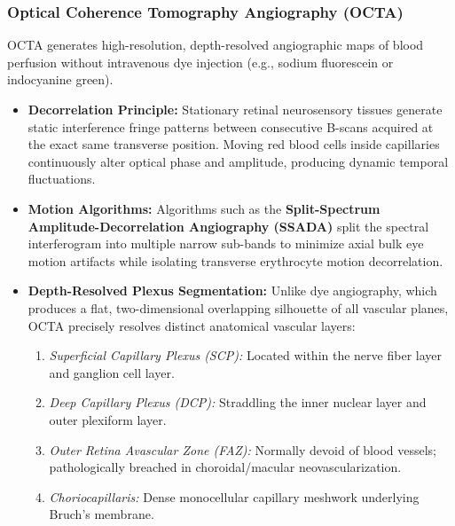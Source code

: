 \documentclass[11pt,a4paper]{article}
\begin{document}
\subsubsection{Optical Coherence Tomography Angiography (OCTA)}
OCTA generates high-resolution, depth-resolved angiographic maps of blood perfusion without intravenous dye injection (e.g., sodium fluorescein or indocyanine green).
\begin{itemize}[leftmargin=*]
    \item \textbf{Decorrelation Principle:} Stationary retinal neurosensory tissues generate static interference fringe patterns between consecutive B-scans acquired at the exact same transverse position. Moving red blood cells inside capillaries continuously alter optical phase and amplitude, producing dynamic temporal fluctuations.
    \item \textbf{Motion Algorithms:} Algorithms such as the \textbf{Split-Spectrum Amplitude-Decorrelation Angiography (SSADA)} split the spectral interferogram into multiple narrow sub-bands to minimize axial bulk eye motion artifacts while isolating transverse erythrocyte motion decorrelation.
    \item \textbf{Depth-Resolved Plexus Segmentation:} Unlike dye angiography, which produces a flat, two-dimensional overlapping silhouette of all vascular planes, OCTA precisely resolves distinct anatomical vascular layers:
    \begin{enumerate}
        \item \textit{Superficial Capillary Plexus (SCP):} Located within the nerve fiber layer and ganglion cell layer.
        \item \textit{Deep Capillary Plexus (DCP):} Straddling the inner nuclear layer and outer plexiform layer.
        \item \textit{Outer Retina Avascular Zone (FAZ):} Normally devoid of blood vessels; pathologically breached in choroidal/macular neovascularization.
        \item \textit{Choriocapillaris:} Dense monocellular capillary meshwork underlying Bruch's membrane.
    \end{enumerate}
\end{itemize}
\end{document}

